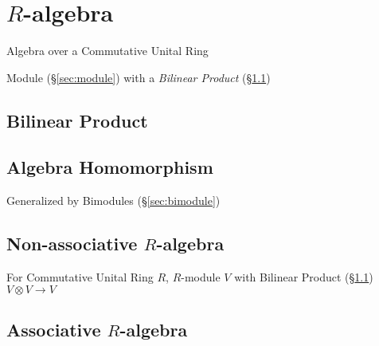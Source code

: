 \section{$R$-algebra}\label{sec:r_algebra}

Algebra over a Commutative Unital Ring

Module (\S\ref{sec:module}) with a \emph{Bilinear Product}
(\S\ref{sec:bilinear_product})



\subsection{Bilinear Product}\label{sec:bilinear_product}

\subsection{Algebra Homomorphism}\label{sec:algebra_homomorphism}

Generalized by Bimodules (\S\ref{sec:bimodule})



\subsection{Non-associative $R$-algebra}
\label{sec:nonassociative_r_algebra}

For Commutative Unital Ring $R$, $R$-module $V$ with Bilinear Product
(\S\ref{sec:bilinear_product}) $V \otimes V \rightarrow V$



\subsection{Associative $R$-algebra}\label{sec:associative_r_algebra}

